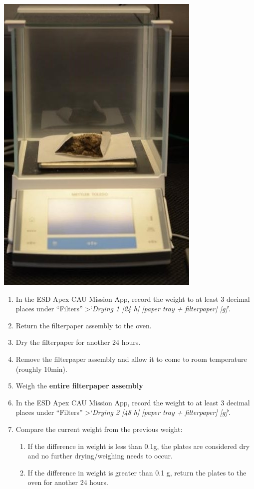 \documentclass[
]{book}
\providecommand{\tightlist}{%
  \setlength{\itemsep}{0pt}\setlength{\parskip}{0pt}}
\begin{document}
\includegraphics{images/CAU_weigh.jpg}

\begin{enumerate}
\def\labelenumi{\arabic{enumi}.}
\setcounter{enumi}{3}
\item
  In the ESD Apex CAU Mission App, record the weight to at least 3 decimal places under ``Filters'' \textgreater{}`\emph{Drying 1 {[}24 h{]} {[}paper tray + filterpaper{]} {[}g{]}}'.
\item
  Return the filterpaper assembly to the oven.
\item
  Dry the filterpaper for another 24 hours.
\item
  Remove the filterpaper assembly and allow it to come to room temperature (roughly 10min).
\item
  Weigh the \textbf{entire filterpaper assembly}
\item
  In the ESD Apex CAU Mission App, record the weight to at least 3 decimal places under ``Filters'' \textgreater{}`\emph{Drying 2 {[}48 h{]} {[}paper tray + filterpaper{]} {[}g{]}}'.
\item
  Compare the current weight from the previous weight:

  \begin{enumerate}
  \def\labelenumii{\alph{enumii}.}
  \tightlist
  \item
    If the difference in weight is less than 0.1g, the plates are considered dry and no further drying/weighing needs to occur.\\
  \item
    If the difference in weight is greater than 0.1 g, return the plates to the oven for another 24 hours.
  \end{enumerate}
\end{enumerate}
\end{document}
